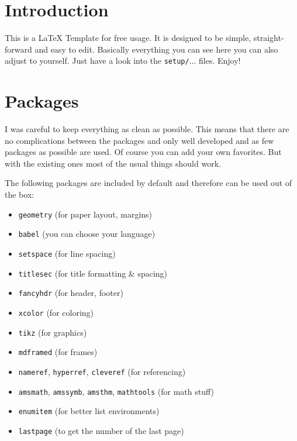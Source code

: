 





\section{Introduction}

This is a \LaTeX{} Template for free usage. It is designed to be simple, straight-forward and easy to edit.
Basically everything you can see here you can also adjust to yourself. Just have a look into the \texttt{setup/$\dotso$} files. Enjoy!

\section{Packages}

I was careful to keep everything as clean as possible. This means that there are
no complications between the packages and only well developed and as few
packages as possible are used. Of course you can add your own favorites. But
with the existing ones most of the usual things should work.

The following packages are included by default and therefore can be used out of
the box:

\begin{itemize}
\item \texttt{geometry} (for paper layout, margins)
\item \texttt{babel} (you can choose your language)
\item \texttt{setspace} (for line spacing)
\item \texttt{titlesec} (for title formatting \& spacing)
\item \texttt{fancyhdr} (for header, footer)
\item \texttt{xcolor} (for coloring)
\item \texttt{tikz} (for graphics)
\item \texttt{mdframed} (for frames)
\item \texttt{nameref}, \texttt{hyperref}, \texttt{cleveref} (for referencing)
\item \texttt{amsmath}, \texttt{amssymb}, \texttt{amsthm}, \texttt{mathtools}
  (for math stuff)
\item \texttt{enumitem} (for better list environments)
\item \texttt{lastpage} (to get the number of the last page)
\end{itemize}

